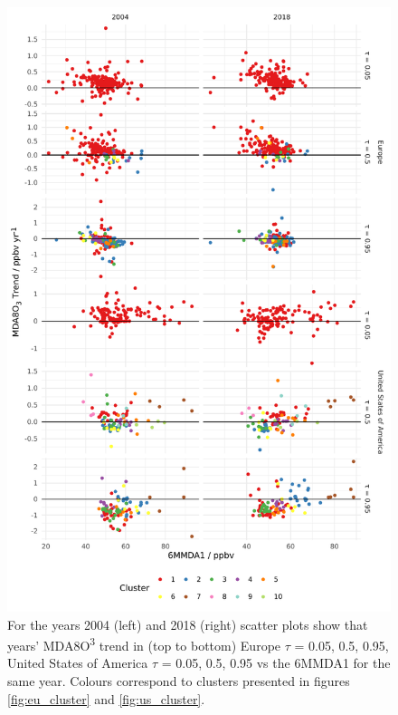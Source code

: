 \documentclass[journal abbreviation, manuscript]{copernicus}
\begin{document}
\clearpage


\begin{figure}[p]
\centering
\includegraphics[height=0.9\textheight]{figures/paper_figures/f13_mda8_cluster_mda8_6mmda1.pdf}
\caption{For the years 2004 (left) and 2018 (right) scatter plots show that years' MDA8O\textsuperscript{3} trend in (top to bottom) Europe $\tau$ = 0.05, 0.5, 0.95, United States of America $\tau$ = 0.05, 0.5, 0.95 vs the 6MMDA1 for the same year. Colours correspond to clusters presented in figures \ref{fig:eu_cluster} and \ref{fig:us_cluster}.}
\label{fig:mda8_cluster_mda8_6mmda1}
\end{figure}
\clearpage
\end{document}

